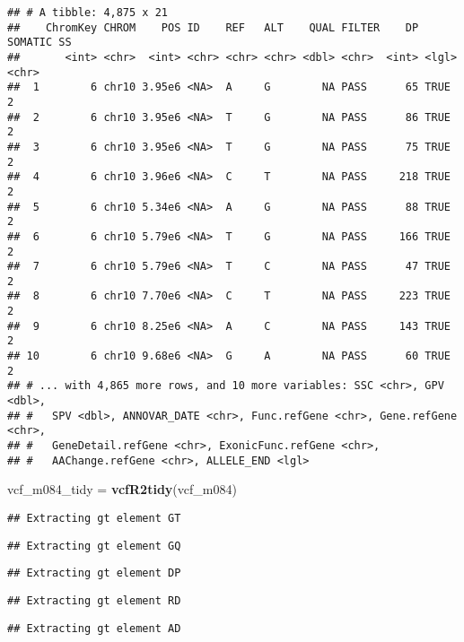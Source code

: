 \documentclass[]{article}
\newenvironment{Shaded}{\begin{snugshade}}{\end{snugshade}}
\newcommand{\KeywordTok}[1]{\textcolor[rgb]{0.13,0.29,0.53}{\textbf{#1}}}
\newcommand{\NormalTok}[1]{#1}
\newcommand{\StringTok}[1]{\textcolor[rgb]{0.31,0.60,0.02}{#1}}
\begin{document}
\begin{verbatim}
## # A tibble: 4,875 x 21
##    ChromKey CHROM    POS ID    REF   ALT    QUAL FILTER    DP SOMATIC SS   
##       <int> <chr>  <int> <chr> <chr> <chr> <dbl> <chr>  <int> <lgl>   <chr>
##  1        6 chr10 3.95e6 <NA>  A     G        NA PASS      65 TRUE    2    
##  2        6 chr10 3.95e6 <NA>  T     G        NA PASS      86 TRUE    2    
##  3        6 chr10 3.95e6 <NA>  T     G        NA PASS      75 TRUE    2    
##  4        6 chr10 3.96e6 <NA>  C     T        NA PASS     218 TRUE    2    
##  5        6 chr10 5.34e6 <NA>  A     G        NA PASS      88 TRUE    2    
##  6        6 chr10 5.79e6 <NA>  T     G        NA PASS     166 TRUE    2    
##  7        6 chr10 5.79e6 <NA>  T     C        NA PASS      47 TRUE    2    
##  8        6 chr10 7.70e6 <NA>  C     T        NA PASS     223 TRUE    2    
##  9        6 chr10 8.25e6 <NA>  A     C        NA PASS     143 TRUE    2    
## 10        6 chr10 9.68e6 <NA>  G     A        NA PASS      60 TRUE    2    
## # ... with 4,865 more rows, and 10 more variables: SSC <chr>, GPV <dbl>,
## #   SPV <dbl>, ANNOVAR_DATE <chr>, Func.refGene <chr>, Gene.refGene <chr>,
## #   GeneDetail.refGene <chr>, ExonicFunc.refGene <chr>,
## #   AAChange.refGene <chr>, ALLELE_END <lgl>
\end{verbatim}

\begin{Shaded}
\begin{Highlighting}[]
\NormalTok{vcf_m084_tidy =}\StringTok{ }\KeywordTok{vcfR2tidy}\NormalTok{(vcf_m084)}
\end{Highlighting}
\end{Shaded}

\begin{verbatim}
## Extracting gt element GT
\end{verbatim}

\begin{verbatim}
## Extracting gt element GQ
\end{verbatim}

\begin{verbatim}
## Extracting gt element DP
\end{verbatim}

\begin{verbatim}
## Extracting gt element RD
\end{verbatim}

\begin{verbatim}
## Extracting gt element AD
\end{verbatim}
\end{document}
